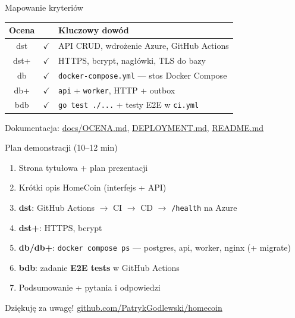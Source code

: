 \documentclass[aspectratio=169,11pt]{beamer}
\begin{document}
\begin{frame}{Mapowanie kryteriów}
  \small
  \begin{tabular}{@{}clp{}@{}}
    \toprule
    \textbf{Ocena} & & \textbf{Kluczowy dowód} \\
    \midrule
    dst   & $\checkmark$ & API CRUD, wdrożenie Azure, GitHub Actions \\
    dst+  & $\checkmark$ & HTTPS, bcrypt, nagłówki, TLS do bazy \\
    db    & $\checkmark$ & \texttt{docker-compose.yml} --- stos Docker Compose \\
    db+   & $\checkmark$ & \texttt{api} + \texttt{worker}, HTTP + outbox \\
    bdb   & $\checkmark$ & \texttt{go test ./...} + testy E2E w \texttt{ci.yml} \\
    \bottomrule
  \end{tabular}

  \vspace{0.6em}
  \normalsize
  Dokumentacja: \href{https://github.com/PatrykGodlewski/homecoin/blob/main/docs/OCENA.md}{docs/OCENA.md},
  \href{https://github.com/PatrykGodlewski/homecoin/blob/main/docs/DEPLOYMENT.md}{DEPLOYMENT.md},
  \href{https://github.com/PatrykGodlewski/homecoin/blob/main/README.md}{README.md}
\end{frame}

\begin{frame}{Plan demonstracji (10--12 min)}
  \begin{enumerate}
    \item Strona tytułowa + plan prezentacji
    \item Krótki opis HomeCoin (interfejs + API)
    \item \textbf{dst}: GitHub Actions $\rightarrow$ CI $\rightarrow$ CD $\rightarrow$ \texttt{/health} na Azure
    \item \textbf{dst+}: HTTPS, bcrypt
    \item \textbf{db/db+}: \texttt{docker compose ps} --- postgres, api, worker, nginx (+ migrate)
    \item \textbf{bdb}: zadanie \textbf{E2E tests} w GitHub Actions
    \item Podsumowanie + pytania i odpowiedzi
  \end{enumerate}
\end{frame}

\begin{frame}
  \centering
  \Large Dziękuję za uwagę!
  \vfill
  \normalsize
  \href{https://github.com/PatrykGodlewski/homecoin}{github.com/PatrykGodlewski/homecoin}
\end{frame}
\end{document}
